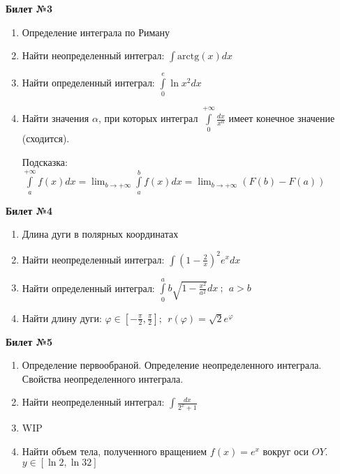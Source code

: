 \documentclass[a4paper, 12pt]{article}
\begin{document}
\begin{center}
	\textbf{Билет №3}
\end{center}
\begin{enumerate}
	\item Определение интеграла по Риману
	\item Найти неопределенный интеграл: $\displaystyle \int{\text{arctg}(x)dx}$
	\item Найти определенный интеграл: $\displaystyle \int\limits_{0}^{e}{\ln{x^2}dx}$
	\item Найти значения $\alpha$, при которых интеграл $\displaystyle \int\limits_{0}^{+\infty}{\frac{dx}{x^{\alpha}}}$ имеет конечное значение (сходится).
	
	Подсказка: $\displaystyle \int\limits_{a}^{+\infty}{f(x)dx} = \lim_{b\to+\infty}{\int\limits_{a}^{b}{f(x)dx}} = \lim_{b\to+\infty}{\left(F(b) - F(a)\right)} $
	
\end{enumerate}
\newpage
\begin{center}
	\textbf{Билет №4}
\end{center}
\begin{enumerate}
	\item Длина дуги в полярных координатах
	\item Найти неопределенный интеграл: $\displaystyle \int{\left(1-\frac{2}{x}\right)^2 e^xdx}$
	\item Найти определенный интеграл: $\displaystyle \int\limits_{0}^{a}{b\sqrt{1 - \frac{x^2}{a^2}}dx} \ ; \ \ a > b$
	\item Найти длину дуги: $\displaystyle \varphi \in \left[-\frac{\pi}{2}, \frac{\pi}{2}\right];\ \  r(\varphi) = \displaystyle \sqrt{2}e^{\varphi}$
	
\end{enumerate}

\begin{center}
	\textbf{Билет №5}
\end{center}
\begin{enumerate}
	\item Определение первообраной. Определение неопределенного интеграла. Свойства неопределенного интеграла.
	\item Найти неопределенный интеграл: $\displaystyle \int{\frac{dx}{2^x + 1}}$
	\item WIP
	\item Найти объем тела, полученного вращением $\displaystyle f(x) = e^x$ вокруг оси $OY$. $\displaystyle y \in \left[\ln{2},\ln{32}\right]$ 
\end{enumerate}
\end{document}
